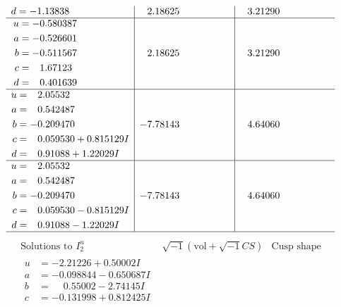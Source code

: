 \documentclass[1p]{elsarticle_modified}
\theoremstyle{definition}
\newcommand{\I}{\sqrt{-1}}
\begin{document}
$$\begin{array}{c|c|c}
\begin{aligned}
d &= -1.13838\phantom{ +0.000000I}\end{aligned}
 & \phantom{-}2.18625\phantom{ +0.000000I} & \phantom{-}3.21290\phantom{ +0.000000I} \\ \hline\begin{aligned}
u &= -0.580387\phantom{ +0.000000I} \\
a &= -0.526601\phantom{ +0.000000I} \\
b &= -0.511567\phantom{ +0.000000I} \\
c &= \phantom{-}1.67123\phantom{ +0.000000I} \\
d &= \phantom{-}0.401639\phantom{ +0.000000I}\end{aligned}
 & \phantom{-}2.18625\phantom{ +0.000000I} & \phantom{-}3.21290\phantom{ +0.000000I} \\ \hline\begin{aligned}
u &= \phantom{-}2.05532\phantom{ +0.000000I} \\
a &= \phantom{-}0.542487\phantom{ +0.000000I} \\
b &= -0.209470\phantom{ +0.000000I} \\
c &= \phantom{-}0.059530 + 0.815129 I \\
d &= \phantom{-}0.91088 + 1.22029 I\end{aligned}
 & -7.78143\phantom{ +0.000000I} & \phantom{-}4.64060\phantom{ +0.000000I} \\ \hline\begin{aligned}
u &= \phantom{-}2.05532\phantom{ +0.000000I} \\
a &= \phantom{-}0.542487\phantom{ +0.000000I} \\
b &= -0.209470\phantom{ +0.000000I} \\
c &= \phantom{-}0.059530 - 0.815129 I \\
d &= \phantom{-}0.91088 - 1.22029 I\end{aligned}
 & -7.78143\phantom{ +0.000000I} & \phantom{-}4.64060\phantom{ +0.000000I}\\
 \hline 
 \end{array}$$\newpage$$\begin{array}{c|c|c}  
\text{Solutions to }I^u_{2}& \I (\text{vol} + \sqrt{-1}CS) & \text{Cusp shape}\\
 \hline 
\begin{aligned}
u &= -2.21226 + 0.50002 I \\
a &= -0.098844 - 0.650687 I \\
b &= \phantom{-}0.55002 - 2.74145 I \\
c &= -0.131998 + 0.812425 I \\

\end{aligned}
\end{array}$$
\end{document}
